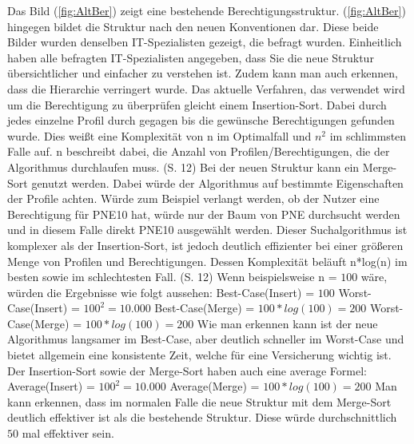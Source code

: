 \newpage
Das Bild (\ref{fig:AltBer}) zeigt eine bestehende Berechtigungsstruktur.
(\ref{fig:AltBer}) hingegen bildet die Struktur nach den neuen Konventionen dar.
Diese beide Bilder wurden denselben IT-Spezialisten gezeigt, die befragt wurden.
Einheitlich haben alle befragten IT-Spezialisten angegeben, dass Sie die neue Struktur übersichtlicher und einfacher zu verstehen ist.
Zudem kann man auch erkennen, dass die Hierarchie verringert wurde.
\newline
Das aktuelle Verfahren, das verwendet wird um die Berechtigung zu überprüfen gleicht einem Insertion-Sort.
Dabei durch jedes einzelne Profil durch gegagen bis die gewünsche Berechtigungen gefunden wurde.
Dies weißt eine Komplexität von n im Optimalfall und $n^2$ im schlimmsten Falle auf.
n beschreibt dabei, die Anzahl von Profilen/Berechtigungen, die der Algorithmus durchlaufen muss. \cite{weblogIn,log} (S. 12)
\newline
Bei der neuen Struktur kann ein Merge-Sort genutzt werden.
Dabei würde der Algorithmus auf bestimmte Eigenschaften der Profile achten.
Würde zum Beispiel verlangt werden, ob der Nutzer eine Berechtigung für PNE10 hat, würde nur der Baum von PNE durchsucht werden und in diesem Falle direkt PNE10 ausgewählt werden.
Dieser Suchalgorithmus ist komplexer als der Insertion-Sort, ist jedoch deutlich effizienter bei einer größeren Menge von Profilen und Berechtigungen.
Dessen Komplexität beläuft n*log(n) im besten sowie im schlechtesten Fall. \cite{weblogMer,log} (S. 12)
\newline
Wenn beispielsweise n = $100$ wäre, würden die Ergebnisse wie folgt aussehen:
\newline
\newline
Best-Case(Insert) = $100$
\newline
Worst-Case(Insert) = $100^2 = 10.000$
\newline
\newline
Best-Case(Merge) = $100*log(100) = 200$
\newline
Worst-Case(Merge) = $100*log(100) = 200$
\newline
\newline
Wie man erkennen kann ist der neue Algorithmus langsamer im Best-Case, aber deutlich schneller im Worst-Case und bietet allgemein eine konsistente Zeit, welche für eine Versicherung wichtig ist.
Der Insertion-Sort sowie der Merge-Sort haben auch eine average Formel: \cite{weblogMer,weblogIn}
\newline
\newline
Average(Insert) = $100^2 = 10.000$
\newline
\newline
Average(Merge) = $100*log(100) = 200$
\newline
\newline
Man kann erkennen, dass im normalen Falle die neue Struktur mit dem Merge-Sort deutlich effektiver ist als die bestehende Struktur.
Diese würde durchschnittlich $50$ mal effektiver sein.
\newpage
